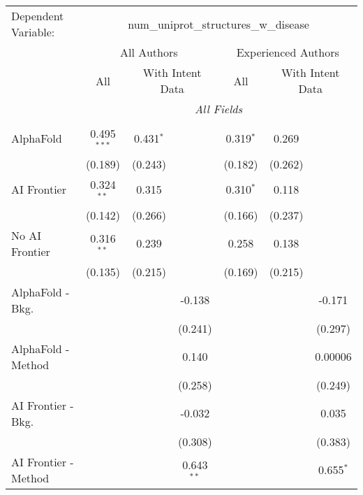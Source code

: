 \begingroup
\centering
\begin{tabular}{lcccccc}
   \tabularnewline \midrule \midrule
   Dependent Variable: & \multicolumn{6}{c}{num\_uniprot\_structures\_w\_disease}\\
 & \multicolumn{3}{c}{All Authors} & \multicolumn{3}{c}{Experienced Authors} \\
\cmidrule(lr){2-4} \cmidrule(lr){5-7}
 & \multicolumn{1}{c}{All} & \multicolumn{2}{c}{With Intent Data} & \multicolumn{1}{c}{All} & \multicolumn{2}{c}{With Intent Data} \\
\cmidrule(lr){2-2} \cmidrule(lr){3-4} \cmidrule(lr){5-5} \cmidrule(lr){6-7}
 & \multicolumn{6}{c}{\textit{All Fields}} \\ \\
   AlphaFold               & 0.495$^{***}$ & 0.431$^{*}$ &               & 0.319$^{*}$ & 0.269   &   \\   
                           & (0.189)       & (0.243)     &               & (0.182)     & (0.262) &   \\   
   AI Frontier             & 0.324$^{**}$  & 0.315       &               & 0.310$^{*}$ & 0.118   &   \\   
                           & (0.142)       & (0.266)     &               & (0.166)     & (0.237) &   \\   
   No AI Frontier          & 0.316$^{**}$  & 0.239       &               & 0.258       & 0.138   &   \\   
                           & (0.135)       & (0.215)     &               & (0.169)     & (0.215) &   \\   
   AlphaFold - Bkg.        &               &             & -0.138        &             &         & -0.171\\   
                           &               &             & (0.241)       &             &         & (0.297)\\   
   AlphaFold - Method      &               &             & 0.140         &             &         & 0.00006\\   
                           &               &             & (0.258)       &             &         & (0.249)\\   
   AI Frontier - Bkg.      &               &             & -0.032        &             &         & 0.035\\   
                           &               &             & (0.308)       &             &         & (0.383)\\   
   AI Frontier - Method    &               &             & 0.643$^{**}$  &             &         & 0.655$^{*}$\\   

\end{tabular}
